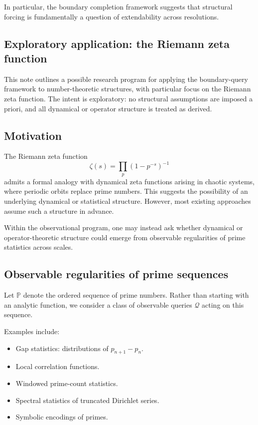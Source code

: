 \documentclass[11pt]{article}
\begin{document}
In particular, the boundary completion framework suggests that structural
forcing is fundamentally a question of extendability across resolutions.

\subsection{Exploratory application: the Riemann zeta function}
\label{sec:zeta-program}

This note outlines a possible research program for applying the boundary-query
framework to number-theoretic structures, with particular focus on the Riemann
zeta function. The intent is exploratory: no structural assumptions are imposed
a priori, and all dynamical or operator structure is treated as derived.

\subsection{Motivation}

The Riemann zeta function
\[
\zeta(s) = \prod_{p} (1 - p^{-s})^{-1}
\]
admits a formal analogy with dynamical zeta functions arising in chaotic systems,
where periodic orbits replace prime numbers. This suggests the possibility of an
underlying dynamical or statistical structure. However, most existing approaches
assume such a structure in advance.

Within the observational program, one may instead ask whether dynamical
or operator-theoretic structure could emerge from observable
regularities of prime statistics across scales.

\subsection{Observable regularities of prime sequences}

Let $\mathbb{P}$ denote the ordered sequence of prime numbers. Rather than
starting with an analytic function, we consider a class of observable queries
$\mathcal{Q}$ acting on this sequence.

Examples include:
\begin{itemize}
  \item Gap statistics: distributions of $p_{n+1} - p_n$.
  \item Local correlation functions.
  \item Windowed prime-count statistics.
  \item Spectral statistics of truncated Dirichlet series.
  \item Symbolic encodings of primes.
\end{itemize}
\end{document}
